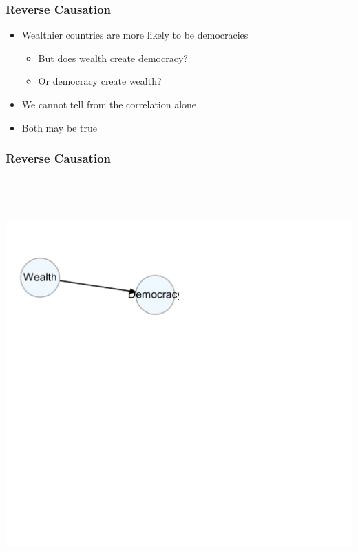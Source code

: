 \documentclass[xcolor=x11names,compress]{beamer}\usepackage[]{graphicx}\usepackage[]{color}
\newenvironment{knitrout}{}{} %
\renewcommand{\(}{\begin{columns}}
\renewcommand{\)}{\end{columns}}
\newcommand{\<}[1]{\begin{column}{#1}}
\renewcommand{\>}{\end{column}}
\begin{document}
\begin{frame}
\frametitle{Reverse Causation}
\begin{itemize}
\item Wealthier countries are more likely to be democracies
\pause
\begin{itemize}
\item But does wealth create democracy?
\pause
\item Or democracy create wealth?
\pause
\end{itemize}
\item We cannot tell from the correlation alone
\pause
\item Both may be true
\end{itemize}
\end{frame}

\begin{frame}
\frametitle{Reverse Causation}
\begin{knitrout}
\color{fgcolor}

{\centering \includegraphics[width=600,height=600]{figure/unnamed-chunk-3-1} 

}



\end{knitrout}
\end{frame}
\end{document}

